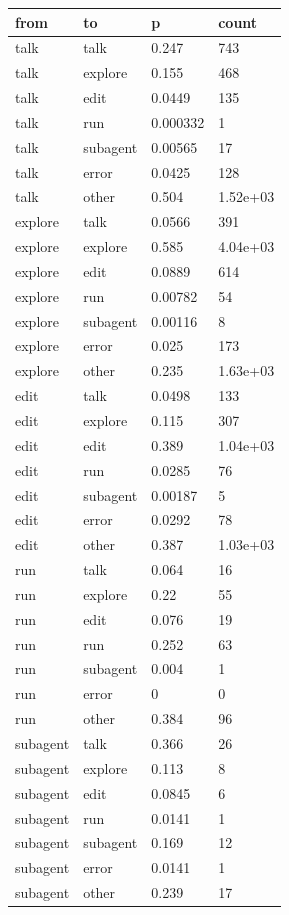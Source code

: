 \begin{tabular}{llll}
\toprule
from & to & p & count \\
\midrule
talk & talk & 0.247 & 743 \\
talk & explore & 0.155 & 468 \\
talk & edit & 0.0449 & 135 \\
talk & run & 0.000332 & 1 \\
talk & subagent & 0.00565 & 17 \\
talk & error & 0.0425 & 128 \\
talk & other & 0.504 & 1.52e+03 \\
explore & talk & 0.0566 & 391 \\
explore & explore & 0.585 & 4.04e+03 \\
explore & edit & 0.0889 & 614 \\
explore & run & 0.00782 & 54 \\
explore & subagent & 0.00116 & 8 \\
explore & error & 0.025 & 173 \\
explore & other & 0.235 & 1.63e+03 \\
edit & talk & 0.0498 & 133 \\
edit & explore & 0.115 & 307 \\
edit & edit & 0.389 & 1.04e+03 \\
edit & run & 0.0285 & 76 \\
edit & subagent & 0.00187 & 5 \\
edit & error & 0.0292 & 78 \\
edit & other & 0.387 & 1.03e+03 \\
run & talk & 0.064 & 16 \\
run & explore & 0.22 & 55 \\
run & edit & 0.076 & 19 \\
run & run & 0.252 & 63 \\
run & subagent & 0.004 & 1 \\
run & error & 0 & 0 \\
run & other & 0.384 & 96 \\
subagent & talk & 0.366 & 26 \\
subagent & explore & 0.113 & 8 \\
subagent & edit & 0.0845 & 6 \\
subagent & run & 0.0141 & 1 \\
subagent & subagent & 0.169 & 12 \\
subagent & error & 0.0141 & 1 \\
subagent & other & 0.239 & 17 \\

\end{tabular}
